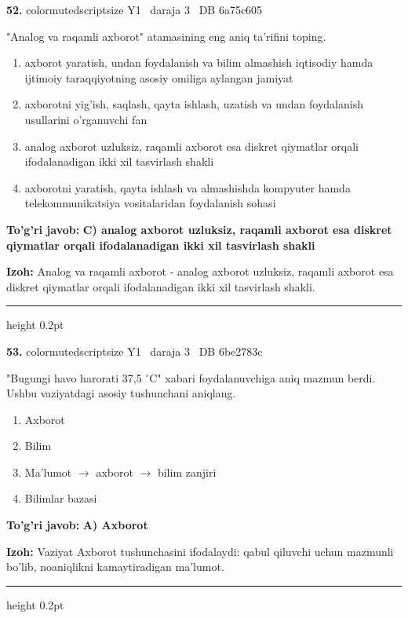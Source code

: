 \documentclass[10pt,a4paper,oneside]{article}
\begin{document}
\noindent\textbf{\color{ink}52.}  {color{muted}scriptsize Y1 \textbullet\ daraja 3 \textbullet\ DB 6a75c605}
\par
"Analog va raqamli axborot" atamasining eng aniq ta'rifini toping.
\begin{enumerate}[label=\Alph*),leftmargin=9mm]
\item axborot yaratish, undan foydalanish va bilim almashish iqtisodiy hamda ijtimoiy taraqqiyotning asosiy omiliga aylangan jamiyat
\item axborotni yig'ish, saqlash, qayta ishlash, uzatish va undan foydalanish usullarini o'rganuvchi fan
\item analog axborot uzluksiz, raqamli axborot esa diskret qiymatlar orqali ifodalanadigan ikki xil tasvirlash shakli
\item axborotni yaratish, qayta ishlash va almashishda kompyuter hamda telekommunikatsiya vositalaridan foydalanish sohasi
\end{enumerate}
\begin{tcolorbox}[enhanced,breakable,colback=teal!4,colframe=teal!50!black,boxrule=0.5pt,arc=1.1mm,left=3mm,right=3mm,top=1.7mm,bottom=1.7mm,before skip=2mm,after skip=2mm]
\textbf{\color{teal}To'g'ri javob:} \textbf{C) analog axborot uzluksiz, raqamli axborot esa diskret qiymatlar orqali ifodalanadigan ikki xil tasvirlash shakli}
\par\smallskip
\textbf{Izoh:} Analog va raqamli axborot - analog axborot uzluksiz, raqamli axborot esa diskret qiymatlar orqali ifodalanadigan ikki xil tasvirlash shakli.
\end{tcolorbox}
\vspace{2mm}\hrule height 0.2pt \vspace{3mm}

\noindent\textbf{\color{ink}53.}  {color{muted}scriptsize Y1 \textbullet\ daraja 3 \textbullet\ DB 6be2783c}
\par
"Bugungi havo harorati 37,5 \ensuremath{^\circ}C" xabari foydalanuvchiga aniq mazmun berdi. Ushbu vaziyatdagi asosiy tushunchani aniqlang.
\begin{enumerate}[label=\Alph*),leftmargin=9mm]
\item Axborot
\item Bilim
\item Ma'lumot \ensuremath{\to} axborot \ensuremath{\to} bilim zanjiri
\item Bilimlar bazasi
\end{enumerate}
\begin{tcolorbox}[enhanced,breakable,colback=teal!4,colframe=teal!50!black,boxrule=0.5pt,arc=1.1mm,left=3mm,right=3mm,top=1.7mm,bottom=1.7mm,before skip=2mm,after skip=2mm]
\textbf{\color{teal}To'g'ri javob:} \textbf{A) Axborot}
\par\smallskip
\textbf{Izoh:} Vaziyat Axborot tushunchasini ifodalaydi: qabul qiluvchi uchun mazmunli bo'lib, noaniqlikni kamaytiradigan ma'lumot.
\end{tcolorbox}
\vspace{2mm}\hrule height 0.2pt \vspace{3mm}
\end{document}
